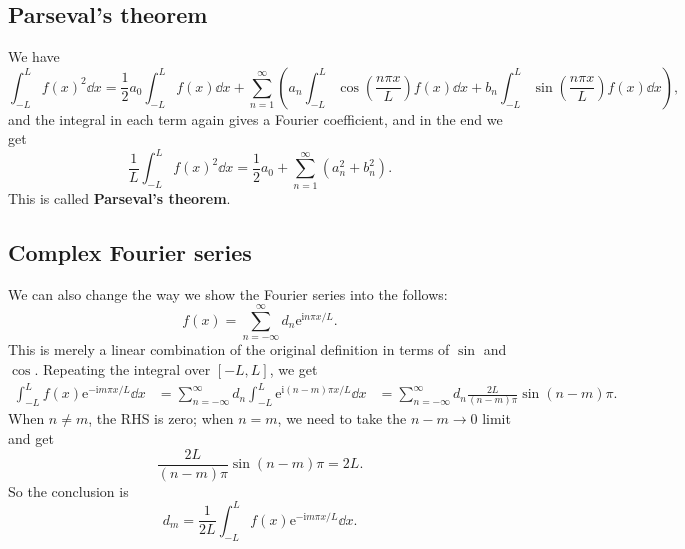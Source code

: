 \documentclass[hyperref, a4paper]{article}
\newcommand*{\ii}{\mathrm{i}}
\newcommand*{\ee}{\mathrm{e}}
\newcommand*{\concept}[1]{{\textbf{#1}}}
\def\\{}%
\begin{document}
\subsection{Parseval's theorem}

We have 
\[
    \int_{-L}^{L} f(x)^2 \dd{x} 
    = \frac{1}{2} a_0 \int_{-L}^{L} f(x) \dd{x}
    + \sum_{n=1}^{\infty} \left(
        a_n \int_{-L}^{L} \cos(\frac{n \pi x}{L}) f(x) \dd{x}
        + b_n \int_{-L}^{L} \sin(\frac{n \pi x}{L}) f(x) \dd{x}
    \right),
\]
and the integral in each term again gives a Fourier coefficient,
and in the end we get 
\begin{equation}
    \frac{1}{L} \int_{-L}^{L} f(x)^2 \dd{x}
    = \frac{1}{2} a_0 
    + \sum_{n=1}^{\infty} (a_n^2 + b_n^2). 
\end{equation}
This is called \concept{Parseval's theorem}. 

\subsection{Complex Fourier series}

We can also change the way we show the Fourier series into the follows: 
\begin{equation}
    f(x) = \sum_{n=-\infty}^{\infty} d_n \ee^{\ii n \pi x / L}.
\end{equation}
This is merely a linear combination of the original definition in terms of $\sin$ and $\cos$.
Repeating the integral over $[-L, L]$, we get 
\[
    \begin{aligned}
        \int_{-L}^{L} f(x) \ee^{- \ii m \pi x / L} \dd{x} 
        &= \sum_{n=-\infty}^{\infty} d_n
        \int_{-L}^{L}  \ee^{\ii (n - m) \pi x / L} \dd{x} \\
        &= \sum_{n=-\infty}^{\infty} d_n
        \frac{2 L }{(n - m) \pi} \sin (n - m) \pi. 
    \end{aligned}
\] 
When $n \neq m$, the RHS is zero; 
when $n = m$, we need to take the $n - m \to 0$ limit and get 
\[
    \frac{2 L }{(n - m) \pi} \sin (n - m) \pi = 2 L.  
\]
So the conclusion is 
\begin{equation}
    d_m = \frac{1}{2L} 
        \int_{-L}^{L} f(x) \ee^{- \ii m \pi x / L} \dd{x} .
\end{equation}
\end{document}
